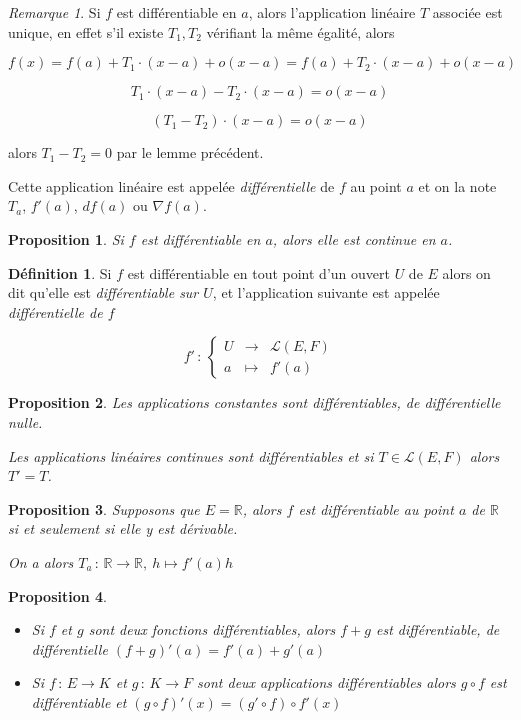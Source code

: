 \documentclass[]{article}
\newtheorem{myproposition}{Proposition}
\theoremstyle{remark}
\newtheorem{myrem}{Remarque}
\theoremstyle{definition}
\newtheorem{mydef}{Définition}
\newcommand{\func}[5]{
#1 \, : \, \left\{ \begin{array}{lcl}
	#2 & \longrightarrow & #3 \\
	#4 & \longmapsto & #5
\end{array}
\right.
}
\newcommand{\funcinline}[5]{
#1 \, : \, #2 \longrightarrow #3, ~ #4 \longmapsto #5
}
\newcommand{\funcshort}[3]{
#1 \, : \, #2 \longrightarrow #3
}
\begin{document}
\begin{myrem}
	Si $f$ est différentiable en $a$, alors l'application linéaire $T$ associée est unique, en effet s'il existe $T_1, T_2$ vérifiant la même égalité, alors
	
	$$f(x) = f(a) + T_1 \cdot (x-a) + o(x-a) = f(a) + T_2 \cdot (x-a) + o(x-a)$$
	
	$$T_1 \cdot (x-a) - T_2 \cdot (x-a) = o(x-a)$$
	
	$$(T_1 - T_2) \cdot (x-a) = o(x-a)$$
	
	alors $T_1 - T_2 = 0$ par le lemme précédent.

	Cette application linéaire est appelée \textit{différentielle} de $f$ au point $a$ et on la note $T_a$, $f'(a)$, $df(a)$ ou $\nabla f(a)$.
\end{myrem}

\begin{myproposition}
	Si $f$ est différentiable en $a$, alors elle est continue en $a$.
\end{myproposition}

\begin{mydef}
	Si $f$ est différentiable en tout point d'un ouvert $U$ de $E$ alors on dit qu'elle est \textit{différentiable sur $U$}, et l'application suivante est appelée \textit{différentielle de $f$}
	
	$$\func{f'}{U}{\mathcal{L}(E, F)}{a}{f'(a)}$$
\end{mydef}

\begin{myproposition}
	Les applications constantes sont différentiables, de différentielle nulle.
	
	Les applications linéaires continues sont différentiables et si $T \in \mathcal{L}(E, F)$ alors $T'=T$.
\end{myproposition}

\begin{myproposition}
	Supposons que $E = \mathbb{R}$, alors $f$ est différentiable au point $a$ de $\mathbb{R}$ si et seulement si elle y est dérivable.
	
	On a alors $\funcinline{T_a}{\mathbb{R}}{\mathbb{R}}{h}{f'(a)h}$
\end{myproposition}

\begin{myproposition}
	\leavevmode
	\begin{itemize}
		\item Si $f$ et $g$ sont deux fonctions différentiables, alors $f+g$ est différentiable, de différentielle $(f+g)'(a)=f'(a)+g'(a)$
		\item Si $\funcshort{f}{E}{K}$ et $\funcshort{g}{K}{F}$ sont deux applications différentiables alors $g \circ f$ est différentiable et $(g \circ f)'(x) = (g'\circ f) \circ f'(x)$
	\end{itemize}
\end{myproposition}
\end{document}
